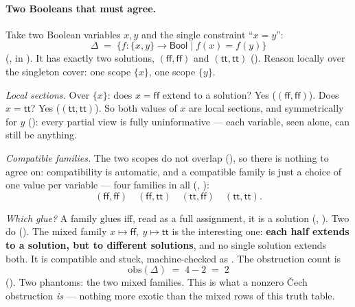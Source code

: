 \documentclass[11pt]{article}
\newcommand{\obs}{\mathrm{obs}}
\begin{document}
\paragraph{Two Booleans that must agree.}  Take two Boolean variables
$x, y$ and the single constraint ``$x = y$'':
\[
  \Delta \;=\; \{f : \{x,y\} \to \mathsf{Bool} \mid f(x) = f(y)\}
\]
(, in ).  It has exactly two
solutions, $(\mathsf{ff},\mathsf{ff})$ and
$(\mathsf{tt},\mathsf{tt})$ ().  Reason locally
over the singleton cover: one scope $\{x\}$, one scope $\{y\}$.

\emph{Local sections.}  Over $\{x\}$: does $x = \mathsf{ff}$ extend
to a solution?  Yes ($(\mathsf{ff},\mathsf{ff})$).  Does $x =
\mathsf{tt}$?  Yes ($(\mathsf{tt},\mathsf{tt})$).  So both values of
$x$ are local sections, and symmetrically for $y$
(): every partial view is fully
uninformative --- each variable, seen alone, can still be anything.

\emph{Compatible families.}  The two scopes do not overlap
(), so there is nothing to agree
on: compatibility is automatic, and a compatible family is just a
choice of one value per variable --- four families in all
(,
):
\[
(\mathsf{ff},\mathsf{ff}) \quad (\mathsf{ff},\mathsf{tt}) \quad
(\mathsf{tt},\mathsf{ff}) \quad (\mathsf{tt},\mathsf{tt}).
\]

\emph{Which glue?}  A family glues iff, read as a full assignment, it
is a solution (, ).  Two
do ().  The mixed family $x
\mapsto \mathsf{ff},\ y \mapsto \mathsf{tt}$ is the interesting one:
\textbf{each half extends to a solution, but to different solutions},
and no single solution extends both.  It is compatible and stuck,
machine-checked as .  The
obstruction count is
\[
  \obs(\Delta) \;=\; 4 - 2 \;=\; 2
\]
().  Two phantoms: the two mixed
families.  This is what a nonzero \v{C}ech obstruction \emph{is} ---
nothing more exotic than the mixed rows of this truth table.
\end{document}
